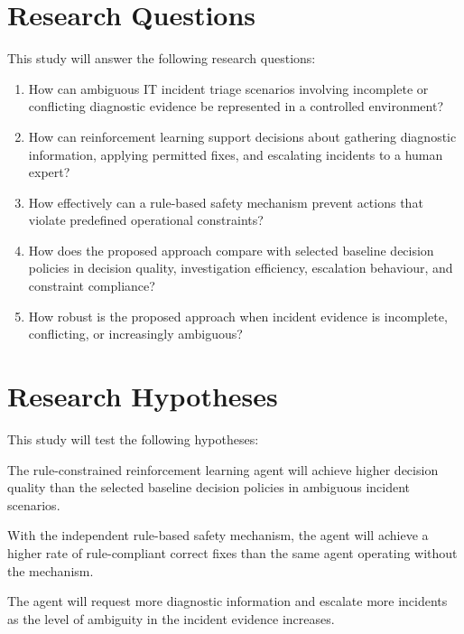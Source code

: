 \section{Research Questions}

This study will answer the following research questions:

\begin{enumerate}
  \item How can ambiguous IT incident triage scenarios involving incomplete or conflicting diagnostic evidence be represented in a controlled environment?
  \item How can reinforcement learning support decisions about gathering diagnostic information, applying permitted fixes, and escalating incidents to a human expert?
  \item How effectively can a rule-based safety mechanism prevent actions that violate predefined operational constraints?
  \item How does the proposed approach compare with selected baseline decision policies in decision quality, investigation efficiency, escalation behaviour, and constraint compliance?
  \item How robust is the proposed approach when incident evidence is incomplete, conflicting, or increasingly ambiguous?
\end{enumerate}

\section{Research Hypotheses}

This study will test the following hypotheses:

\begin{description}[leftmargin=3.2em,labelwidth=2.6em,labelsep=0.6em]
  \item[\textbf{H1:}] The rule-constrained reinforcement learning agent will achieve higher decision quality than the selected baseline decision policies in ambiguous incident scenarios.
  \item[\textbf{H2:}] With the independent rule-based safety mechanism, the agent will achieve a higher rate of rule-compliant correct fixes than the same agent operating without the mechanism.
  \item[\textbf{H3:}] The agent will request more diagnostic information and escalate more incidents as the level of ambiguity in the incident evidence increases.
\end{description}

